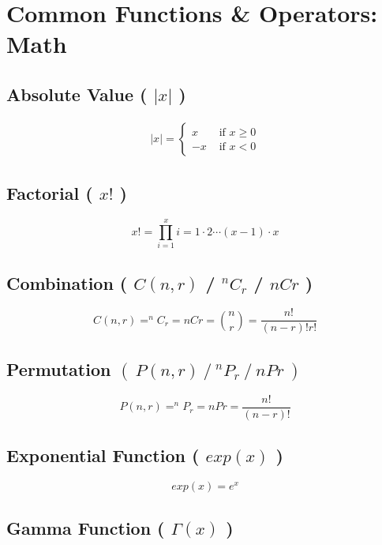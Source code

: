 \chapter{Common Functions \& Operators: Math}



\section{Absolute Value ( $|x|$ )}\label{abs_value}
\begin{align}
    \left| x \right| = \begin{cases}
       x & \text{ if\ } x \geq 0 \\
       -x & \text{ if\ } x < 0 
    \end{cases}
\end{align}


\section{Factorial ( $x!$ )}\label{Factorial}
\[
    x! = \prod_{i=1}^{x} i = 1 \cdot 2 \cdots (x-1) \cdot x 
\]

\section{Combination ( $C(n,r)$ / $^nC_r$ / $nCr$ ) } \label{Combination}

\[
    C(n,r) = ^nC_r = nCr = \displaystyle\binom{n}{r} = \displaystyle\frac{n!}{(n-r)!r!}
\]

\section{Permutation \( \left(\ P(n,r)\ /\ ^nP_r\ /\ nPr\ \right) \)} \label{Permutation}

\[
    P(n,r) = ^nP_r = nPr = \displaystyle\frac{n!}{(n-r)!}
\]

\section{Exponential Function ( $exp(x)$ )}\label{Exponential Function}

\[
    exp(x) = e^x
\]

\section{Gamma Function ( $\Gamma(x)$ )}\label{Gamma Function}


